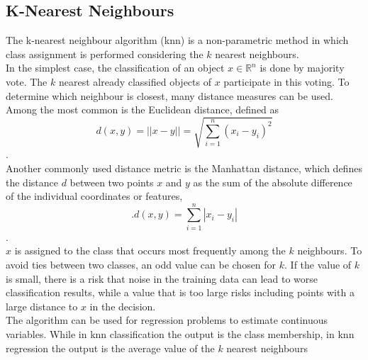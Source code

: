 \subsection{K-Nearest Neighbours}
The k-nearest neighbour algorithm (knn) is a non-parametric method in which class assignment is performed considering the $k$ nearest neighbours. \\
In the simplest case, the classification of an object $x\in\mathbb{R}^n$ is done by majority vote. The $k$ nearest already classified objects of $x$ participate in this voting. To determine which neighbour is closest, many distance measures can be used. Among the most common is the Euclidean distance, defined as
\begin{equation}
    d\left(x,y\right)=\left|\left|x-y\right|\right|=\sqrt{\sum_{i=1}^n\left(x_i-y_i\right)^2}
\end{equation}
\autocite[][]{danielsson1980euclidean}.\\
Another commonly used distance metric is the Manhattan distance, which defines the distance $d$ between two points $x$ and $y$ as the sum of the absolute difference of the individual coordinates or features,
\begin{equation}
    .d\left(x, y\right) = \sum_{i=1}^n\left|x_i-y_i\right|
\end{equation}
\autocite[][]{krause1986taxicab}. \\
$x$ is assigned to the class that occurs most frequently among the $k$ neighbours. To avoid ties between two classes, an odd value can be chosen for $k$. 
If the value of $k$ is small, there is a risk that noise in the training data can lead to worse classification results, while a value that is too large risks including points with a large distance to $x$ in the decision. \\
The algorithm can be used for regression problems to estimate continuous variables. While in knn classification the output is the class membership, in knn regression the output is the average value of the $k$ nearest neighbours \autocite[][]{altman1992introduction}
